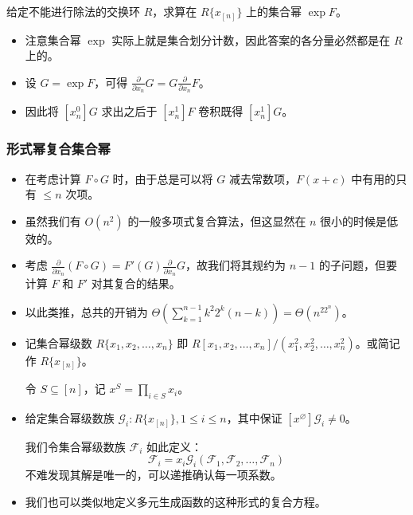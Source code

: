 \documentclass[mathserif]{ctexbeamer}
\begin{document}
\frame
{
  \begin{example}
  给定不能进行除法的交换环 $R$，求算在 $R\{x_{[n]}\}$ 上的集合幂 $\exp F$。
  \end{example}
  
  \begin{itemize}
  \item<1-> 注意集合幂 $\exp$ 实际上就是集合划分计数，因此答案的各分量必然都是在 $R$ 上的。
  \item<2-> 设 $G=\exp F$，可得 $\frac{\partial}{\partial x_n} G = G\frac{\partial}{\partial x_n} F$。
  \item<3-> 因此将 $[x_n^0]G$ 求出之后于 $[x_n^1]F$ 卷积既得 $[x_n^1]G$。
  \end{itemize}
}

\frame
{
  \frametitle{形式幂复合集合幂}
  
  \begin{itemize}
  \item<1-> 在考虑计算 $F\circ G$ 时，由于总是可以将 $G$ 减去常数项，$F(x+c)$ 中有用的只有 $\le n$ 次项。
  \item<2-> 虽然我们有 $O(n^2)$ 的一般多项式复合算法，但这显然在 $n$ 很小的时候是低效的。
  \item<3-> 考虑 $\frac{\partial}{\partial x_n} (F \circ G) = F'(G)\frac{\partial}{\partial x_n} G$，故我们将其规约为 $n-1$ 的子问题，但要计算 $F$ 和 $F'$ 对其复合的结果。
  \item<4-> 以此类推，总共的开销为 $\Theta \left(\sum_{k=1}^{n-1} k^2 2^k (n-k)\right) = \Theta(n^22^n)$。
  \end{itemize}
}

\frame
{
  \begin{itemize}
  \item<1-> 记集合幂级数 $R\{x_1, x_2, \dots, x_n\}$ 即 $R[x_1, x_2, \dots, x_n]/(x_1^2,x_2^2,\dots,x_n^2)$。或简记作 $R\{x_{[n]}\}$。

令 $S \subseteq [n]$，记 $x^S = \prod_{i \in S} x_i$。



  \item<2-> 给定集合幂级数族 $\mathcal G_i : R\{x_{[n]}\}, 1\le i\le n$，其中保证 $[x^\varnothing]\mathcal G_i \neq 0$。

我们令集合幂级数族 $\mathcal F_i$ 如此定义：
$$
\mathcal F_i = x_i \mathcal G_i(\mathcal F_1, \mathcal F_2, \dots, \mathcal F_n)
$$
不难发现其解是唯一的，可以递推确认每一项系数。

  \item<3-> 我们也可以类似地定义多元生成函数的这种形式的复合方程。
  \end{itemize}
}
\end{document}
